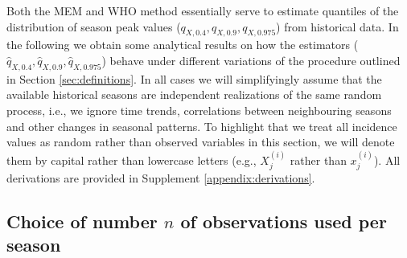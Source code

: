 \documentclass{article}
\begin{document}
Both the MEM and WHO method essentially serve to estimate quantiles of the distribution of season peak values ($q_{X, 0.4}, q_{X, 0.9}, q_{X, 0.975}$) from historical data. In the following we obtain some analytical results on how the estimators ($\hat{q}_{X, 0.4}, \hat{q}_{X, 0.9}, \hat{q}_{X, 0.975}$) behave under different variations of the procedure outlined in Section \ref{sec:definitions}. In all cases we will simplifyingly assume that the available historical seasons are independent realizations of the same random process, i.e., we ignore time trends, correlations between neighbouring seasons and other changes in seasonal patterns. To highlight that we treat all incidence values as random rather than observed variables in this section, we will denote them by capital rather than lowercase letters (e.g., $X_j^{(i)}$ rather than $x_j^{(i)}$). All derivations are provided in Supplement \ref{appendix:derivations}.


\subsection{Choice of number $n$ of observations used per season}
\label{subsec:choice_n}
\end{document}
